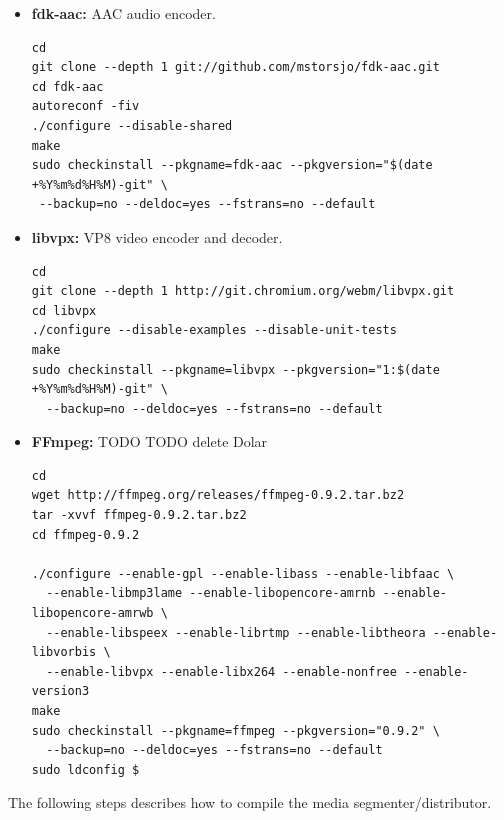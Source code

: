 \begin{itemize}
\item{\textbf{fdk-aac:}} AAC audio encoder.

\begin{code}
\begin{verbatim}
cd
git clone --depth 1 git://github.com/mstorsjo/fdk-aac.git
cd fdk-aac
autoreconf -fiv
./configure --disable-shared
make
sudo checkinstall --pkgname=fdk-aac --pkgversion="$(date +%Y%m%d%H%M)-git" \
 --backup=no --deldoc=yes --fstrans=no --default
\end{verbatim}
\end{code}

\item{\textbf{libvpx:}} VP8 video encoder and decoder.

\begin{code}
\begin{verbatim}
cd
git clone --depth 1 http://git.chromium.org/webm/libvpx.git
cd libvpx
./configure --disable-examples --disable-unit-tests
make
sudo checkinstall --pkgname=libvpx --pkgversion="1:$(date +%Y%m%d%H%M)-git" \
  --backup=no --deldoc=yes --fstrans=no --default  
\end{verbatim}
\end{code}

\item{\textbf{FFmpeg:}} TODO TODO delete Dolar
\begin{code}
\begin{verbatim}
cd
wget http://ffmpeg.org/releases/ffmpeg-0.9.2.tar.bz2
tar -xvvf ffmpeg-0.9.2.tar.bz2 
cd ffmpeg-0.9.2

./configure --enable-gpl --enable-libass --enable-libfaac \
  --enable-libmp3lame --enable-libopencore-amrnb --enable-libopencore-amrwb \
  --enable-libspeex --enable-librtmp --enable-libtheora --enable-libvorbis \
  --enable-libvpx --enable-libx264 --enable-nonfree --enable-version3
make
sudo checkinstall --pkgname=ffmpeg --pkgversion="0.9.2" \
  --backup=no --deldoc=yes --fstrans=no --default
sudo ldconfig $
\end{verbatim}
\end{code}
\end{itemize}

The following steps describes how to compile the media segmenter/distributor.

